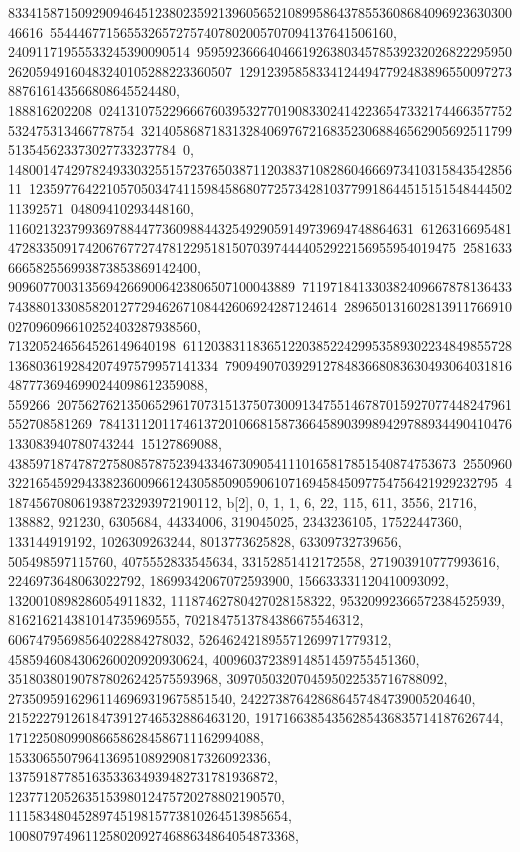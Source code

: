 {{{83341587150929094645123802359213960565210899586437855360868409692363030046616\
5544467715655326572757407802005707094137641506160, 24091171955533245390090514\
95959236664046619263803457853923202682229595026205949160483240105288223360507\
129123958583341244947792483896550097273887616143566808645524480, 188816202208\
02413107522966676039532770190833024142236547332174466357752532475313466778754\
32140586871831328406976721683523068846562905692511799513545623373027733237784\
0, 14800147429782493303255157237650387112038371082860466697341031584354285611\
12359776422105705034741159845868077257342810377991864451515154844450211392571\
04809410293448160, 1160213237993697884477360988443254929059149739694748864631\
61263166954814728335091742067677274781229518150703974444052922156955954019475\
2581633666582556993873853869142400, 90960770031356942669006423806507100043889\
71197184133038240966787813643374388013308582012772946267108442606924287124614\
289650131602813911766910027096096610252403287938560, 713205246564526149640198\
61120383118365122038522429953589302234849855728136803619284207497579957141334\
790949070392912784836680836304930640318164877736946990244098612359088, 559266\
20756276213506529617073151375073009134755146787015927077448247961552708581269\
78413112011746137201066815873664589039989429788934490410476133083940780743244\
15127869088, 4385971874787275808578752394334673090541110165817851540874753673\
25509603221654592943382360096612430585090590610716945845097754756421929232795\
4187456708061938723293972190112}}, 
 {b[2], {0, 1, 1, 6, 22, 115, 611, 3556, 21716, 138882, 921230, 6305684, 
   44334006, 319045025, 2343236105, 17522447360, 133144919192, 1026309263244, 
   8013773625828, 63309732739656, 505498597115760, 4075552833545634, 
   33152851412172558, 271903910777993616, 2246973648063022792, 
   18699342067072593900, 156633331120410093092, 1320010898286054911832, 
   11187462780427028158322, 95320992366572384525939, 
   816216214381014735969555, 7021847513784386675546312, 
   60674795698564022884278032, 526462421895571269971779312, 
   4585946084306260020920930624, 40096037238914851459755451360, 
   351803801907878026242575593968, 3097050320704595022535716788092, 
   27350959162961146969319675851540, 242273876428686457484739005204640, 
   2152227912618473912746532886463120, 19171663854356285436835714187626744, 
   171225080990866586284586711162994088, 
   1533065507964136951089290817326092336, 
   13759187785163533634939482731781936872, 
   123771205263515398012475720278802190570, 
   1115834804528974519815773810264513985654, 
   10080797496112580209274688634864054873368, 
}}}
